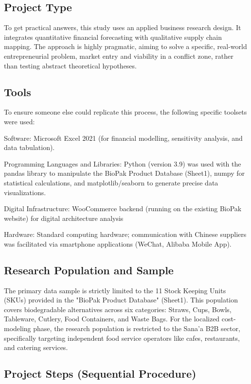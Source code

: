 \documentclass[12pt,a4paper]{article}
\begin{document}
\subsection{Project Type}

To get practical answers, this study uses an applied business research design. It integrates quantitative financial forecasting with qualitative supply chain mapping. The approach is highly pragmatic, aiming to solve a specific, real-world entrepreneurial problem, market entry and viability in a conflict zone, rather than testing abstract theoretical hypotheses.

\subsection{Tools}

To ensure someone else could replicate this process, the following specific toolsets were used:

Software: Microsoft Excel 2021 (for financial modelling, sensitivity analysis, and data tabulation).

Programming Languages and Libraries: Python (version 3.9) was used with the pandas library to manipulate the BioPak Product Database (Sheet1), numpy for statistical calculations, and matplotlib/seaborn to generate precise data visualizations.

Digital Infrastructure: WooCommerce backend (running on the existing BioPak website) for digital architecture analysis

Hardware: Standard computing hardware; communication with Chinese suppliers was facilitated via smartphone applications (WeChat, Alibaba Mobile App).

\subsection{Research Population and Sample}

The primary data sample is strictly limited to the 11 Stock Keeping Units (SKUs) provided in the "BioPak Product Database" (Sheet1). This population covers biodegradable alternatives across six categories: Straws, Cups, Bowls, Tableware, Cutlery, Food Containers, and Waste Bags. For the localized cost-modeling phase, the research population is restricted to the Sana'a B2B sector, specifically targeting independent food service operators like cafes, restaurants, and catering services.

\subsection{Project Steps (Sequential Procedure)}
\end{document}
